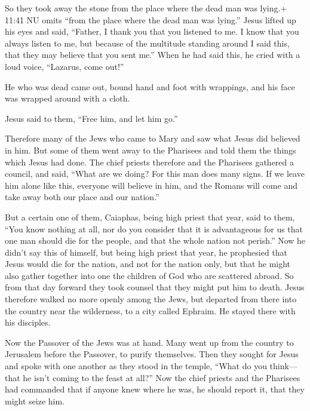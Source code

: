  So they took away the stone from the place where the dead
man was lying.+ 11:41 NU omits ``from the place where the dead man was
lying.'' Jesus lifted up his eyes and said, ``Father, I thank you that
you listened to me.  I know that you always listen to me,
but because of the multitude standing around I said this, that they may
believe that you sent me.''  When he had said this, he
cried with a loud voice, ``Lazarus, come out!''

 He who was dead came out, bound hand and foot with
wrappings, and his face was wrapped around with a cloth.

Jesus said to them, ``Free him, and let him go.''

 Therefore many of the Jews who came to Mary and saw what
Jesus did believed in him.  But some of them went away to
the Pharisees and told them the things which Jesus had done.
 The chief priests therefore and the Pharisees gathered a
council, and said, ``What are we doing? For this man does many signs.
 If we leave him alone like this, everyone will believe in
him, and the Romans will come and take away both our place and our
nation.''

 But a certain one of them, Caiaphas, being high priest
that year, said to them, ``You know nothing at all,  nor do
you consider that it is advantageous for us that one man should die for
the people, and that the whole nation not perish.''  Now he
didn't say this of himself, but being high priest that year, he
prophesied that Jesus would die for the nation,  and not
for the nation only, but that he might also gather together into one the
children of God who are scattered abroad.  So from that day
forward they took counsel that they might put him to death.
 Jesus therefore walked no more openly among the Jews, but
departed from there into the country near the wilderness, to a city
called Ephraim. He stayed there with his disciples.

 Now the Passover of the Jews was at hand. Many went up
from the country to Jerusalem before the Passover, to purify themselves.
 Then they sought for Jesus and spoke with one another as
they stood in the temple, ``What do you think---that he isn't coming to
the feast at all?''  Now the chief priests and the
Pharisees had commanded that if anyone knew where he was, he should
report it, that they might seize him.

